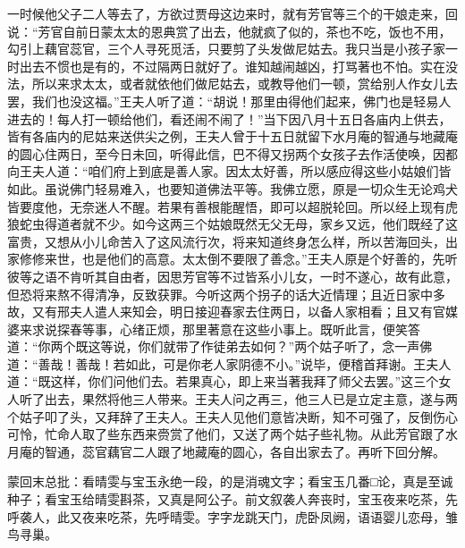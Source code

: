 \begin{parag}
    一时候他父子二人等去了，方欲过贾母这边来时，就有芳官等三个的干娘走来，回说：“芳官自前日蒙太太的恩典赏了出去，他就疯了似的，茶也不吃，饭也不用，勾引上藕官蕊官，三个人寻死觅活，只要剪了头发做尼姑去。我只当是小孩子家一时出去不惯也是有的，不过隔两日就好了。谁知越闹越凶，打骂著也不怕。实在没法，所以来求太太，或者就依他们做尼姑去，或教导他们一顿，赏给别人作女儿去罢，我们也没这福。”王夫人听了道：“胡说！那里由得他们起来，佛门也是轻易人进去的！每人打一顿给他们，看还闹不闹了！”当下因八月十五日各庙内上供去，皆有各庙内的尼姑来送供尖之例，王夫人曾于十五日就留下水月庵的智通与地藏庵的圆心住两日，至今日未回，听得此信，巴不得又拐两个女孩子去作活使唤，因都向王夫人道：“咱们府上到底是善人家。因太太好善，所以感应得这些小姑娘们皆如此。虽说佛门轻易难入，也要知道佛法平等。我佛立愿，原是一切众生无论鸡犬皆要度他，无奈迷人不醒。若果有善根能醒悟，即可以超脱轮回。所以经上现有虎狼蛇虫得道者就不少。如今这两三个姑娘既然无父无母，家乡又远，他们既经了这富贵，又想从小儿命苦入了这风流行次，将来知道终身怎么样，所以苦海回头，出家修修来世，也是他们的高意。太太倒不要限了善念。”王夫人原是个好善的，先听彼等之语不肯听其自由者，因思芳官等不过皆系小儿女，一时不遂心，故有此意，但恐将来熬不得清净，反致获罪。今听这两个拐子的话大近情理；且近日家中多故，又有邢夫人遣人来知会，明日接迎春家去住两日，以备人家相看；且又有官媒婆来求说探春等事，心绪正烦，那里著意在这些小事上。既听此言，便笑答道：“你两个既这等说，你们就带了作徒弟去如何？”两个姑子听了，念一声佛道：“善哉！善哉！若如此，可是你老人家阴德不小。”说毕，便稽首拜谢。王夫人道：“既这样，你们问他们去。若果真心，即上来当著我拜了师父去罢。”这三个女人听了出去，果然将他三人带来。王夫人问之再三，他三人已是立定主意，遂与两个姑子叩了头，又拜辞了王夫人。王夫人见他们意皆决断，知不可强了，反倒伤心可怜，忙命人取了些东西来赍赏了他们，又送了两个姑子些礼物。从此芳官跟了水月庵的智通，蕊官藕官二人跟了地藏庵的圆心，各自出家去了。再听下回分解。
\end{parag}


\begin{parag}
    \begin{note}蒙回末总批：看晴雯与宝玉永绝一段，的是消魂文字；看宝玉几番□论，真是至诚种子；看宝玉给晴雯斟茶，又真是阿公子。前文叙袭人奔丧时，宝玉夜来吃茶，先呼袭人，此又夜来吃茶，先呼晴雯。字字龙跳天门，虎卧凤阙，语语婴儿恋母，雏鸟寻巢。\end{note}
\end{parag}

